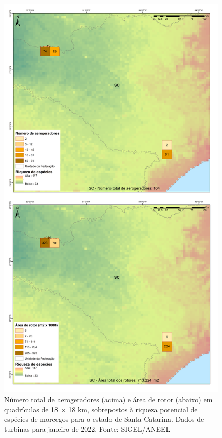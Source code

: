 \documentclass[
  oneside]{scrbook}
\begin{document}
\begin{figure}[H]

{\centering \includegraphics[width=0.7\linewidth]{imagens/cap09/Figura_9.16} 

}

\caption{Número total de aerogeradores (acima) e área de rotor (abaixo) em quadrículas de 18 × 18 km, sobrepostos à riqueza potencial de espécies de morcegos para o estado de Santa Catarina. Dados de turbinas para janeiro de 2022. Fonte: SIGEL/ANEEL}\label{fig:81}
\end{figure}
\end{document}
